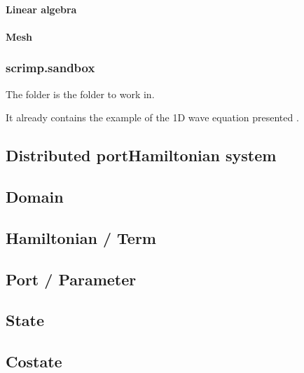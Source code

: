 \documentclass[letterpaper,10pt,english]{sphinxmanual}
\begin{document}
\paragraph{Linear algebra}
\label{\detokenize{scrimp.utils:linear-algebra}}

\paragraph{Mesh}
\label{\detokenize{scrimp.utils:mesh}}
\sphinxstepscope


\subsubsection{scrimp.sandbox}
\label{\detokenize{scrimp.sandbox:scrimp-sandbox}}\label{\detokenize{scrimp.sandbox::doc}}
\sphinxAtStartPar
The  folder is the  folder to work in.

\sphinxAtStartPar
It already contains the example of the 1D wave equation presented .


\subsection{Distributed port\sphinxhyphen{}Hamiltonian system}
\label{\detokenize{scrimp:distributed-port-hamiltonian-system}}

\subsection{Domain}
\label{\detokenize{scrimp:domain}}

\subsection{Hamiltonian / Term}
\label{\detokenize{scrimp:hamiltonian-term}}

\subsection{Port / Parameter}
\label{\detokenize{scrimp:port-parameter}}

\subsection{State}
\label{\detokenize{scrimp:state}}

\subsection{Co\sphinxhyphen{}state}
\label{\detokenize{scrimp:co-state}}
\end{document}
